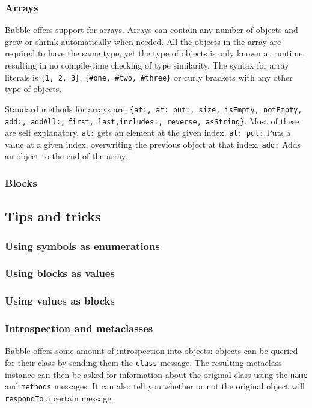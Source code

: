 \documentclass[a4paper]{article}
\begin{document}
\subsubsection{Arrays}

Babble offers support for arrays. Arrays can contain any number of objects and grow or shrink automatically when needed. All the objects in the array are required to have the same type, yet the type of objects is only known at runtime, resulting in no compile-time checking of type similarity. The syntax for array literals is \verb|{1, 2, 3}|, \verb|{#one, #two, #three}| or curly brackets with any other type of objects.

Standard methods for arrays are:
\verb|{at:, at: put:, size, isEmpty, notEmpty, add:, addAll:,|
\verb|first, last,includes:, reverse, asString}|. Most of these are self explanatory, \verb|at:| gets an element at the given index. \verb|at: put:| Puts a value at a given index, overwriting the previous object at that index. \verb|add:| Adds an object to the end of the array.


\subsubsection{Blocks}

\subsection{Tips and tricks}

\subsubsection{Using symbols as enumerations}

\subsubsection{Using blocks as values}

\subsubsection{Using values as blocks}

\subsubsection{Introspection and metaclasses}

Babble offers some amount of introspection into objects: objects can be queried for their class by sending them the \texttt{class} message.
The resulting metaclass instance can then be asked for information about the original class using the \texttt{name} and \texttt{methods} messages.
It can also tell you whether or not the original object will \texttt{respondTo} a certain message.
\end{document}
